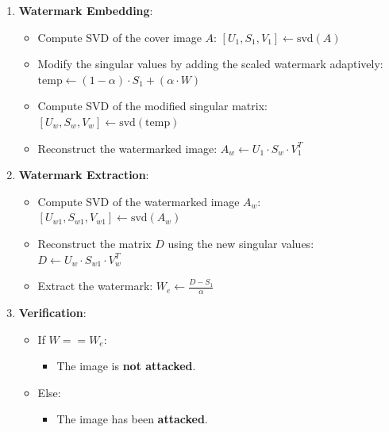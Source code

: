 \documentclass[
  journal,
]{IEEEtran}%
\providecommand{\tightlist}{%
  \setlength{\itemsep}{0pt}\setlength{\parskip}{0pt}}\usepackage{longtable,booktabs,array}
\begin{document}
\begin{enumerate}
\def\labelenumi{\arabic{enumi}.}
\tightlist
\item
  \textbf{Watermark Embedding}:

  \begin{itemize}
  \tightlist
  \item
    Compute SVD of the cover image \(A\):
    \([U_1, S_1, V_1] \gets \text{svd}(A)\)
  \item
    Modify the singular values by adding the scaled watermark
    adaptively:
    \(\text{temp} \gets (1 - \alpha) \cdot S_1 + (\alpha \cdot W)\)
  \item
    Compute SVD of the modified singular matrix:
    \([U_w, S_w, V_w] \gets \text{svd}(\text{temp})\)
  \item
    Reconstruct the watermarked image:
    \(A_w \gets U_1 \cdot S_w \cdot V_1^T\)
  \end{itemize}
\item
  \textbf{Watermark Extraction}:

  \begin{itemize}
  \tightlist
  \item
    Compute SVD of the watermarked image \(A_w\):
    \([U_{w1}, S_{w1}, V_{w1}] \gets \text{svd}(A_w)\)
  \item
    Reconstruct the matrix \(D\) using the new singular values:
    \(D \gets U_w \cdot S_{w1} \cdot V_w^T\)
  \item
    Extract the watermark: \(W_e \gets \frac{D - S_1}{\alpha}\)
  \end{itemize}
\item
  \textbf{Verification}:

  \begin{itemize}
  \tightlist
  \item
    If \(W == W_e\):

    \begin{itemize}
    \tightlist
    \item
      The image is \textbf{not attacked}.
    \end{itemize}
  \item
    Else:

    \begin{itemize}
    \tightlist
    \item
      The image has been \textbf{attacked}.
    \end{itemize}
  \end{itemize}
\end{enumerate}
\end{document}
